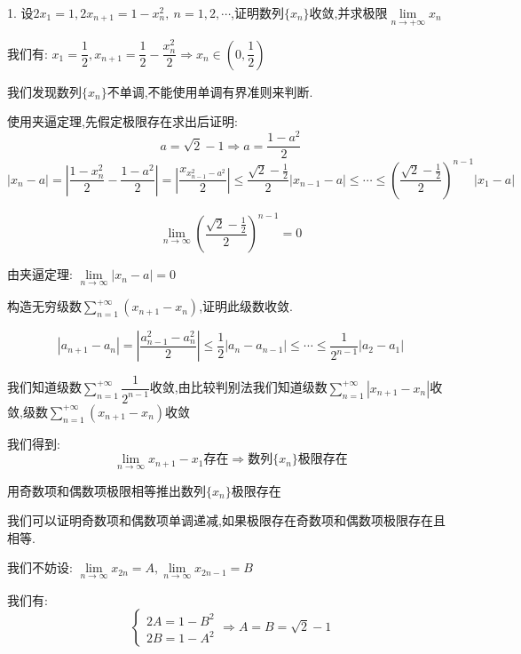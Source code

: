 1. 设$2x_{1}=1,2x_{n+1}=1-x_{n}^2,\ n=1,2,\cdots$,证明数列$\{x_{n}\}$收敛,并求极限$\lim\limits_{n\rightarrow +\infty}x_{n}$
\begin{solution}
	
	我们有: $x_{1}=\dfrac{1}{2},x_{n+1}=\dfrac{1}{2}-\dfrac{x_{n}^2}{2}\Rightarrow x_{n}\in(0,\dfrac{1}{2})$
	
	我们发现数列$\{x_{n}\}$不单调,不能使用单调有界准则来判断.
	\begin{anymark}[方法一]
		使用夹逼定理,先假定极限存在求出后证明: 
		$$a=\sqrt{2}-1\Rightarrow a=\dfrac{1-a^2}{2}$$
		$$|x_{n}-a|=|\dfrac{1-x_{n}^2}{2}-\dfrac{1-a^2}{2}|=|\dfrac{x_{x_{n-1}^2-a^2}}{2}|\leq \dfrac{\sqrt{2}-\frac{1}{2}}{2}|x_{n-1}-a|\leq \cdots\leq (\dfrac{\sqrt{2}-\frac{1}{2}}{2})^{n-1}|x_{1}-a|$$
		
		$$\lim\limits_{n\rightarrow \infty}(\dfrac{\sqrt{2}-\frac{1}{2}}{2})^{n-1}=0$$
		
		由夹逼定理: $\lim\limits_{n\rightarrow \infty}|x_{n}-a|=0$
	\end{anymark}
	\begin{anymark}[方法二]
		构造无穷级数$\sum\limits_{n=1}^{+\infty}(x_{n+1}-x_{n})$,证明此级数收敛.
		
		$$|a_{n+1}-a_{n}|=|\dfrac{a_{n-1}^2-a_{n}^2}{2}|\leq \dfrac{1}{2}|a_{n}-a_{n-1}|\leq \cdots\leq \dfrac{1}{2^{n-1}}|a_{2}-a_{1}|$$
		
		我们知道级数$\sum\limits_{n=1}^{+\infty}\dfrac{1}{2^{n-1}}$收敛,由比较判别法我们知道级数$\sum\limits_{n=1}^{+\infty}|x_{n+1}-x_{n}|$收敛,级数$\sum\limits_{n=1}^{+\infty}(x_{n+1}-x_{n})$收敛
		
		我们得到: 
		$$\lim\limits_{n\rightarrow \infty}x_{n+1}-x_{1}\text{存在}\Rightarrow \text{数列}\{x_{n}\}\text{极限存在}$$
	\end{anymark}
	\begin{anymark}[方法三]
		用奇数项和偶数项极限相等推出数列$\{x_{n}\}$极限存在
		
		我们可以证明奇数项和偶数项单调递减,如果极限存在奇数项和偶数项极限存在且相等.
		
		我们不妨设: $\lim\limits_{n\rightarrow\infty}x_{2n}=A,\lim\limits_{n\rightarrow\infty}x_{2n-1}=B$
		
		我们有: 
		$$\left\lbrace 
		\begin{array}{l}
			2A=1-B^2\\
			2B=1-A^2
		\end{array}
		\right. \Rightarrow A=B=\sqrt{2}-1$$
	\end{anymark}
	

\end{solution}
